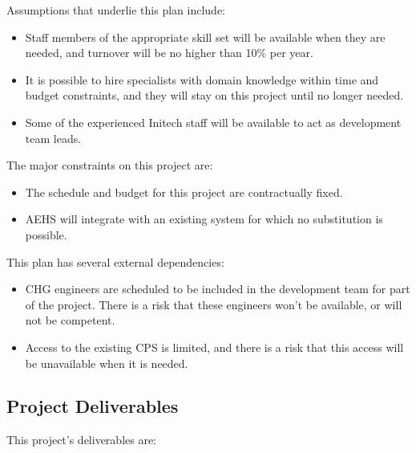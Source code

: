 \documentclass[11pt]{article}
\begin{document}
Assumptions that underlie this plan include:

\begin{itemize}
\item Staff members of the appropriate skill set will be available when they are needed, and turnover
  will be no higher than 10\% per year.
\item It is possible to hire specialists with domain knowledge within time and budget constraints,
  and they will stay on this project until no longer needed.
\item Some of the experienced Initech staff will be available to act as development team leads.
\end{itemize}

The major constraints on this project are:

\begin{itemize}
\item The schedule and budget for this project are contractually fixed.
\item AEHS will integrate with an existing system for which no substitution is possible.
\end{itemize}

This plan has several external dependencies:

\begin{itemize}
\item CHG engineers are scheduled to be included in the development team for part of the project.
  There is a risk that these engineers won't be available, or will not be competent.
\item Access to the existing CPS is limited, and there is a risk that this access will be
  unavailable when it is needed.
\end{itemize}

\subsection{Project Deliverables}
This project's deliverables are:
\end{document}
